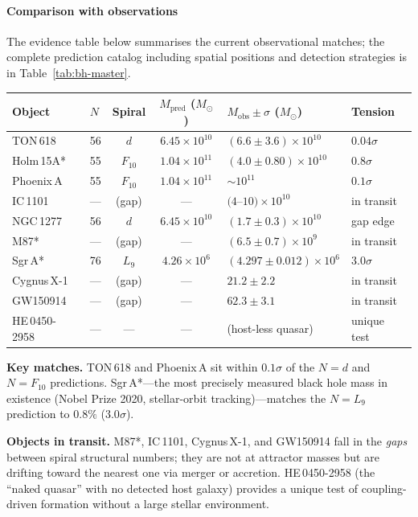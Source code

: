 \documentclass[12pt,a4paper]{article}
\begin{document}
\paragraph{Comparison with observations}

The evidence table below summarises the current observational matches; the complete prediction catalog including spatial positions and detection strategies is in Table~\ref{tab:bh-master}.

\begin{center}\small
\begin{tabular}{ll cc l l}
\toprule
Object & $N$ & Spiral & $M_{\mathrm{pred}}$ ($M_\odot$) & $M_{\mathrm{obs}} \pm \sigma$ ($M_\odot$) & Tension \\
\midrule
TON\,618 & 56 & $d$ & $6.45\times 10^{10}$ & $(6.6 \pm 3.6)\times 10^{10}$ & $0.04\sigma$ \\
Holm\,15A* & 55 & $F_{10}$ & $1.04\times 10^{11}$ & $(4.0 \pm 0.80)\times 10^{10}$ & $0.8\sigma$ \\
Phoenix\,A & 55 & $F_{10}$ & $1.04\times 10^{11}$ & $\sim 10^{11}$ & $0.1\sigma$ \\
IC\,1101 & --- & (gap) & --- & $(4$--$10)\times 10^{10}$ & in transit \\
NGC\,1277 & 56 & $d$ & $6.45\times 10^{10}$ & $(1.7 \pm 0.3)\times 10^{10}$ & gap edge \\
M87* & --- & (gap) & --- & $(6.5 \pm 0.7)\times 10^{9}$ & in transit \\
Sgr\,A* & 76 & $L_9$ & $4.26\times 10^{6}$ & $(4.297 \pm 0.012)\times 10^{6}$ & $3.0\sigma$ \\
Cygnus\,X-1 & --- & (gap) & --- & $21.2 \pm 2.2$ & in transit \\
GW150914 & --- & (gap) & --- & $62.3 \pm 3.1$ & in transit \\
HE\,0450-2958 & --- & --- & --- & (host-less quasar) & unique test \\
\bottomrule
\end{tabular}
\end{center}

\noindent \textbf{Key matches.}\; TON\,618 and Phoenix\,A sit within $0.1\sigma$ of the $N = d$ and $N = F_{10}$ predictions.  Sgr\,A*---the most precisely measured black hole mass in existence (Nobel Prize 2020, stellar-orbit tracking)---matches the $N = L_9$ prediction to $0.8\%$ ($3.0\sigma$).  

\noindent \textbf{Objects in transit.}\; M87*, IC\,1101, Cygnus\,X-1, and GW150914 fall in the \emph{gaps} between spiral structural numbers; they are not at attractor masses but are drifting toward the nearest one via merger or accretion.  HE\,0450-2958 (the ``naked quasar'' with no detected host galaxy) provides a unique test of coupling-driven formation without a large stellar environment.
\end{document}
